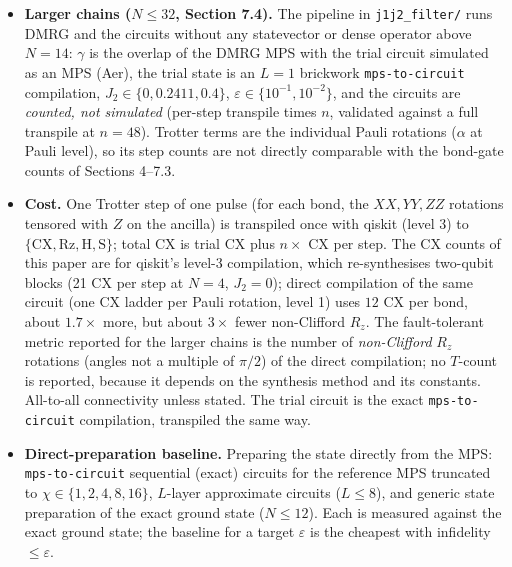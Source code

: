 \documentclass[
]{article}
\begin{document}
\begin{itemize}
  the \(N=16\), \(\varepsilon=10^{-2}\) certified circuits are not
  simulated, and their step counts and CX are reported from the
  certificate.
\item
  \textbf{Larger chains (\(N\le32\), Section 7.4).} The pipeline in
  \texttt{j1j2\_filter/} runs DMRG and the circuits without any
  statevector or dense operator above \(N=14\): \(\gamma\) is the
  overlap of the DMRG MPS with the trial circuit simulated as an MPS
  (Aer), the trial state is an \(L=1\) brickwork \texttt{mps-to-circuit}
  compilation, \(J_2\in\{0,0.2411,0.4\}\),
  \(\varepsilon\in\{10^{-1},10^{-2}\}\), and the circuits are
  \emph{counted, not simulated} (per-step transpile times \(n\),
  validated against a full transpile at \(n=48\)). Trotter terms are the
  individual Pauli rotations (\(\alpha\) at Pauli level), so its step
  counts are not directly comparable with the bond-gate counts of
  Sections 4--7.3.
\item
  \textbf{Cost.} One Trotter step of one pulse (for each bond, the
  \(XX,YY,ZZ\) rotations tensored with \(Z\) on the ancilla) is
  transpiled once with qiskit (level 3) to
  \(\{\mathrm{CX},\mathrm{Rz},\mathrm{H},\mathrm{S}\}\); total CX is
  trial CX plus \(n\times\) CX per step. The CX counts of this paper are
  for qiskit's level-3 compilation, which re-synthesises two-qubit
  blocks (21 CX per step at \(N=4\), \(J_2=0\)); direct compilation of
  the same circuit (one CX ladder per Pauli rotation, level 1) uses
  \(12\) CX per bond, about \(1.7\times\) more, but about \(3\times\)
  fewer non-Clifford \(R_z\). The fault-tolerant metric reported for the
  larger chains is the number of \emph{non-Clifford} \(R_z\) rotations
  (angles not a multiple of \(\pi/2\)) of the direct compilation; no
  \(T\)-count is reported, because it depends on the synthesis method
  and its constants. All-to-all connectivity unless stated. The trial
  circuit is the exact \texttt{mps-to-circuit} compilation, transpiled
  the same way.
\item
  \textbf{Direct-preparation baseline.} Preparing the state directly
  from the MPS: \texttt{mps-to-circuit} sequential (exact) circuits for
  the reference MPS truncated to \(\chi\in\{1,2,4,8,16\}\), \(L\)-layer
  approximate circuits (\(L\le8\)), and generic state preparation of the
  exact ground state (\(N\le12\)). Each is measured against the exact
  ground state; the baseline for a target \(\varepsilon\) is the
  cheapest with infidelity \(\le\varepsilon\).
\end{itemize}
\end{document}
